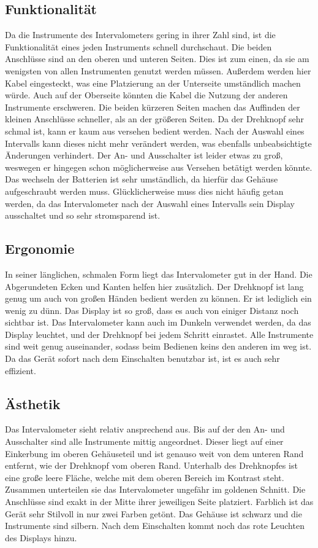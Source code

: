 \documentclass[a4paper,10pt]{article}
\begin{document}
\subsection*{Funktionalität}
Da die Instrumente des Intervalometers gering in ihrer Zahl sind, ist die Funktionalität eines jeden Instruments schnell durchschaut. Die beiden Anschlüsse sind an den oberen und unteren Seiten. Dies ist zum einen, da sie am wenigsten von allen Instrumenten genutzt werden müssen. Außerdem werden hier Kabel eingesteckt, was eine Platzierung an der Unterseite umständlich machen würde. Auch auf der Oberseite könnten die Kabel die Nutzung der anderen Instrumente erschweren. Die beiden kürzeren Seiten machen das Auffinden der kleinen Anschlüsse schneller, als an der größeren Seiten. Da der Drehknopf sehr schmal ist, kann er kaum aus versehen bedient werden. Nach der Auswahl eines Intervalls kann dieses nicht mehr verändert werden, was ebenfalls unbeabsichtigte Änderungen verhindert. Der An- und Ausschalter ist leider etwas zu groß, weswegen er hingegen schon möglicherweise aus Versehen betätigt werden könnte. Das wechseln der Batterien ist sehr umständlich, da hierfür das Gehäuse aufgeschraubt werden muss. Glücklicherweise muss dies nicht häufig getan werden, da das Intervalometer nach der Auswahl eines Intervalls sein Display ausschaltet und so sehr stromsparend ist.

\subsection*{Ergonomie}
In seiner länglichen, schmalen Form liegt das Intervalometer gut in der Hand. Die Abgerundeten Ecken und Kanten helfen hier zusätzlich. Der Drehknopf ist lang genug um auch von großen Händen bedient werden zu können. Er ist lediglich ein wenig zu dünn. Das Display ist so groß, dass es auch von einiger Distanz noch sichtbar ist. Das Intervalometer kann auch im Dunkeln verwendet werden, da das Display leuchtet, und der Drehknopf bei jedem Schritt einrastet. Alle Instrumente sind weit genug auseinander, sodass beim Bedienen keins den anderen im weg ist. Da das Gerät sofort nach dem Einschalten benutzbar ist, ist es auch sehr effizient.

\subsection*{Ästhetik}
Das Intervalometer sieht relativ ansprechend aus. Bis auf der den An- und Ausschalter sind alle Instrumente mittig angeordnet. Dieser liegt auf einer Einkerbung im oberen Gehäuseteil und ist genauso weit von dem unteren Rand entfernt, wie der Drehknopf vom oberen Rand. Unterhalb des Drehknopfes ist eine große leere Fläche, welche mit dem oberen Bereich im Kontrast steht. Zusammen unterteilen sie das Intervalometer ungefähr im goldenen Schnitt. Die Anschlüsse sind exakt in der Mitte ihrer jeweiligen Seite platziert. Farblich ist das Gerät sehr Stilvoll in nur zwei Farben getönt. Das Gehäuse ist schwarz und die Instrumente sind silbern. Nach dem Einschalten kommt noch das rote Leuchten des Displays hinzu.
\end{document}

